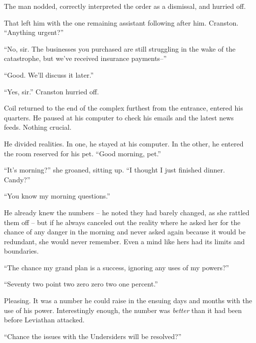 The man nodded, correctly interpreted the order as a dismissal, and hurried off.



That left him with the one remaining assistant following after him.  Cranston.  ``Anything urgent?''



``No, sir.  The businesses you purchased are still struggling in the wake of the catastrophe, but we've received insurance payments--''



``Good.  We'll discuss it later.''



``Yes, sir.''  Cranston hurried off.



Coil returned to the end of the complex furthest from the entrance, entered his quarters.  He paused at his computer to check his emails and the latest news feeds.  Nothing crucial.



He divided realities.  In one, he stayed at his computer.  In the other, he entered the room reserved for his pet.  ``Good morning, pet.''



``It's morning?'' she groaned, sitting up.  ``I thought I just finished dinner.  Candy?''



``You know my morning questions.''



He already knew the numbers – he noted they had barely changed, as she rattled them off – but if he always canceled out the reality where he asked her for the chance of any danger in the morning and never asked again because it would be redundant, she would never remember.  Even a mind like hers had its limits and boundaries.



``The chance my grand plan is a success, ignoring any uses of my powers?''



``Seventy two point two zero zero two one percent.''



Pleasing.  It was a number he could raise in the ensuing days and months with the use of his power.  Interestingly enough, the number was\emph{ better} than it had been before Leviathan attacked.



``Chance the issues with the Undersiders will be resolved?''



